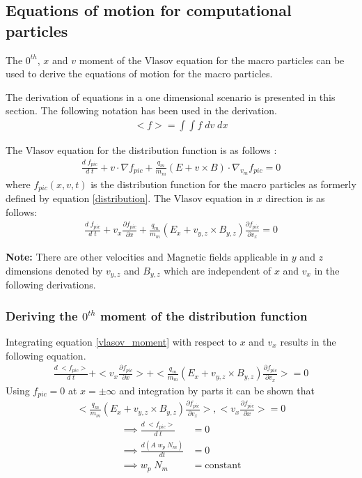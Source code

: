 \documentclass{article}
\begin{document}
\subsection*{Equations of motion for computational particles}
The $0^{th}$, $x$ and $v$ moment of the Vlasov equation for the macro particles can be used to derive the equations of motion for the macro particles. 

The derivation of equations in a one dimensional scenario is presented in this section. The following notation has been used in the derivation.
\begin{align}
<f> = \int \int f\;dv\;dx    
\end{align}

The Vlasov equation for the distribution function is as follows :
\begin{align}
\frac{d\;f_{pic}}{d\;t} + v\cdot\nabla f_{pic} + \frac{q_{m}}{m_{m}}(E + v \times B)\cdot \nabla_{v_{m}}f_{pic} = 0
\end{align}
where $f_{pic}(x, v, t)$ is the distribution function for the macro particles as formerly defined by equation \ref{distribution}.
The Vlasov equation in $x$ direction is as follows:
\begin{align}
\frac{d\;f_{pic}}{d\;t} + v_{x} \frac{\partial f_{pic}}{\partial x} + \frac{q_{m}}{m_{m}}(E_{x} + v_{y,z} \times B_{y,z})\frac{\partial f_{pic}}{\partial v_{x}} = 0 \label{vlasov_moment}
\end{align}

\textbf{Note:} There are other velocities and Magnetic fields applicable in $y$ and $z$ dimensions denoted by $v_{y,z}$ and $B_{y,z}$ which are independent of $x$ and $v_{x}$ in the following derivations.

\subsubsection*{Deriving the $0^{th}$ moment of the distribution function}

Integrating equation \ref{vlasov_moment} with respect to $x$ and $v_{x}$ results in the following equation.
\begin{align}
\frac{d\;<f_{pic}>}{d\;t} + <v_{x} \frac{\partial f_{pic}}{\partial x}> + <\frac{q_{m}}{m_{m}}(E_{x} + v_{y,z} \times B_{y,z}) \frac{\partial f_{pic}}{\partial v_{x}}> = 0 
\end{align}
Using $f_{pic}= 0$ at $x=\pm\infty$ and integration by parts it can be shown that
\begin{align}
<\frac{q_{m}}{m_{m}}(E_{x} + v_{y,z} \times B_{y,z}) \frac{\partial f_{pic}}{\partial v_{x}}>, <v_{x} \frac{\partial f_{pic}}{\partial x}>  = 0 
\end{align}
\begin{align}
\implies \frac{d\;<f_{pic}>}{d\;t} &= 0 \\
\implies \frac{d(A\;w_{p}\;N_{m})}{dt} &= 0 \\
\implies w_{p}\;N_{m} &= \mathrm{constant}
\end{align}
\end{document}
